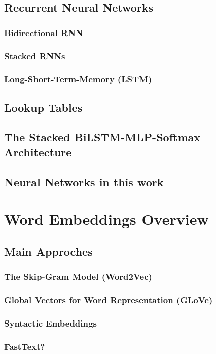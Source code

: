 \subsection{Recurrent Neural Networks}
\subsubsection{Bidirectional RNN}
\subsubsection{Stacked RNNs}
\subsubsection{Long-Short-Term-Memory (LSTM)}
\subsection{Lookup Tables}
\subsection{The Stacked BiLSTM-MLP-Softmax Architecture}
\subsection{Neural Networks in this work}
\pagebreak

\section{Word Embeddings Overview}
\subsection{Main Approches}
\subsubsection{The Skip-Gram Model (Word2Vec)}
\subsubsection{Global Vectors for Word Representation (GLoVe)}
\subsubsection{Syntactic Embeddings}
\subsubsection{FastText?}
